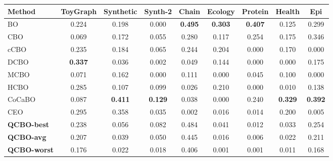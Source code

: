 \begin{tabular}{@{}lcccccccc@{}}
\toprule
\textbf{Method} & ToyGraph & Synthetic & Synth-2 & Chain & Ecology & Protein & Health & Epi \\
\midrule
BO & 0.224 & 0.198 & 0.000 & \textbf{0.495} & \textbf{0.303} & \textbf{0.407} & 0.125 & 0.299 \\
CBO & 0.069 & 0.172 & 0.055 & 0.280 & 0.117 & 0.254 & 0.175 & 0.346 \\
cCBO & 0.235 & 0.184 & 0.065 & 0.244 & 0.204 & 0.000 & 0.170 & 0.000 \\
DCBO & \textbf{0.337} & 0.036 & 0.002 & 0.049 & 0.144 & 0.000 & 0.000 & 0.175 \\
MCBO & 0.071 & 0.162 & 0.000 & 0.111 & 0.000 & 0.045 & 0.100 & 0.000 \\
HCBO & 0.285 & 0.107 & 0.099 & 0.026 & 0.210 & 0.000 & 0.010 & 0.138 \\
CoCaBO & 0.087 & \textbf{0.411} & \textbf{0.129} & 0.038 & 0.000 & 0.240 & \textbf{0.329} & \textbf{0.392} \\
CEO & 0.295 & 0.358 & 0.035 & 0.002 & 0.016 & 0.014 & 0.200 & 0.005 \\
\midrule
\textbf{QCBO-best} & 0.238 & 0.056 & 0.082 & 0.484 & 0.041 & 0.012 & 0.033 & 0.254 \\
\textbf{QCBO-avg} & 0.207 & 0.039 & 0.050 & 0.445 & 0.016 & 0.006 & 0.022 & 0.211 \\
\textbf{QCBO-worst} & 0.176 & 0.022 & 0.018 & 0.406 & 0.001 & 0.001 & 0.011 & 0.168 \\
\bottomrule
\end{tabular}

